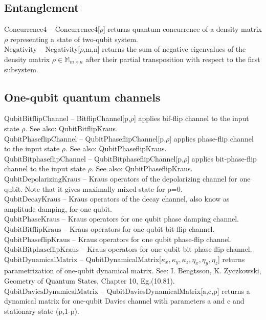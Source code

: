 \subsection{Entanglement}

\noindent\textbf{$ \text{Concurrence4} $ }-- Concurrence4[$\rho $] returns quantum concurrence of a density matrix $\rho $ representing a state of two-qubit system.$  $\\
\noindent\textbf{$ \text{Negativity} $ }-- Negativity[$\rho $,m,n] returns the sum of negative eigenvalues of the density matrix $\rho \in $$ \mathbb{M}_{m\times n} $ after their partial transposition with respect to the first subsystem.$  $\\
\subsection{One-qubit quantum channels}

\noindent\textbf{$ \text{QubitBitflipChannel} $ }-- BitflipChannel[p,$\rho $] applies bif-flip channel to the input state $\rho $. See also: QubitBitflipKraus.$  $\\
\noindent\textbf{$ \text{QubitPhaseflipChannel} $ }-- QubitPhaseflipChannel[p,$\rho $] applies phase-flip channel to the input state $\rho $. See also: QubitPhaseflipKraus.$  $\\
\noindent\textbf{$ \text{QubitBitphaseflipChannel} $ }-- QubitBitphaseflipChannel[p,$\rho $] applies bit-phase-flip channel to the input state $\rho $. See also: QubitPhaseflipKraus.$  $\\
\noindent\textbf{$ \text{QubitDepolarizingKraus} $ }-- Kraus operators of the depolarizing channel for one qubit. Note that it gives maximally mixed state for p=0.$  $\\
\noindent\textbf{$ \text{QubitDecayKraus} $ }-- Kraus operators of the decay channel, also know as amplitude damping, for one qubit.$  $\\
\noindent\textbf{$ \text{QubitPhaseKraus} $ }-- Kraus operators for one qubit phase damping channel.$  $\\
\noindent\textbf{$ \text{QubitBitflipKraus} $ }-- Kraus operators for one qubit bit-flip channel.$  $\\
\noindent\textbf{$ \text{QubitPhaseflipKraus} $ }-- Kraus operators for one qubit phase-flip channel.$  $\\
\noindent\textbf{$ \text{QubitBitphaseflipKraus} $ }-- Kraus operators for one qubit bit-phase-flip channel.$  $\\
\noindent\textbf{$ \text{QubitDynamicalMatrix} $ }-- QubitDynamicalMatrix[$ \kappa _x,\kappa _y,\kappa _z,\eta _x,\eta _y,\eta _z $] returns parametrization of one-qubit dynamical matrix. See: I. Bengtsson, K. Zyczkowski, Geometry of Quantum States, Chapter 10, Eg.(10.81).$  $\\
\noindent\textbf{$ \text{QubitDaviesDynamicalMatrix} $ }-- QubitDaviesDynamicalMatrix[a,c,p] returns a dynamical matrix for one-qubit Davies channel with parameters a and c and stationary state (p,1-p).$  $\\
